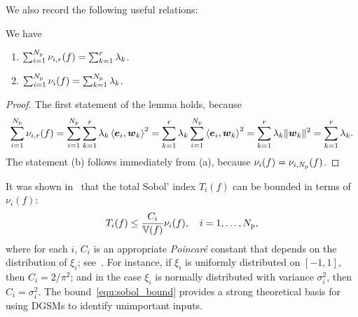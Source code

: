We also record the following useful relations:
\begin{lemma}\label{lem:sum}
We have
\begin{enumerate}[label=(\alph*)]
\item $\sum_{i = 1}^\Np \act{f}{i}{r} = \sum_{k = 1}^r \lambda_k$. 
\item $\sum_{i = 1}^\Np \nu_i(f) = \sum_{k = 1}^\Np \lambda_k$. 
\end{enumerate}
\end{lemma}
\begin{proof}
The first statement of the lemma holds, because
\[
\sum_{i=1}^\Np \act{f}{i}{r}    
= \sum_{i=1}^\Np \sum_{k=1}^r \lambda_k \ip{\vec{e}_i}{\vec{w}_k}^2 
= \sum_{k=1}^r \lambda_k \sum_{i=1}^\Np \ip{\vec{e}_i}{\vec{w}_k}^2 
= \sum_{k=1}^r \lambda_k \| \vec{w}_k \|^2 = \sum_{k=1}^r \lambda_k.
\]
The statement (b) follows immediately from (a), because $\nu_i(f) = \act{f}{i}{\Np}$.
\end{proof}

It was shown in~\cite{Lamboni:2013} that the total Sobol' 
index $T_i(f)$ can be bounded in terms of $\nu_i(f)$:
\begin{equation}\label{equ:sobol_bound}
T_i(f) \leq \frac{C_i}{\V(f)}\nu_i(f), \quad i = 1, \ldots, \Np,
\end{equation}
where for each $i$, $C_i$ is an appropriate \emph{Poincar\'{e}} constant
that depends on the distribution of $\xi_i$; see~\cite{Lamboni:2013}.
For instance, if $\xi_i$ is uniformly distributed on $[-1, 1]$, then $C_i = 2/\pi^2$; and in the 
case $\xi_i$ is normally distributed with variance $\sigma_i^2$, then $C_i = \sigma_i^2$. 
The bound~\eqref{equ:sobol_bound} provides a strong theoretical basis for using DGSMs to identify 
unimportant inputs. 

